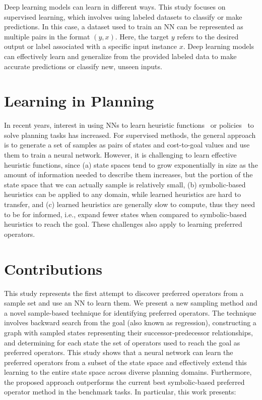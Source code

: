 \documentclass[ppgc,diss,english]{iiufrgs}
\begin{document}
Deep learning models can learn in different ways. This study focuses on supervised learning, which involves using labeled datasets to classify or make predictions. In this case, a dataset used to train an NN can be represented as multiple pairs in the format $(y, x)$. Here, the target $y$ refers to the desired output or label associated with a specific input instance $x$. Deep learning models can effectively learn and generalize from the provided labeled data to make accurate predictions or classify new, unseen inputs.

\section{Learning in Planning}
\label{sec:intro-learning-planning}
In recent years, interest in using NNs to learn heuristic functions~\cite{Ferber.etal/2020a,Yu.etal/2020,Shen.etal/2020,Ferber.etal/2022,OToole/2022} or policies~\cite{Toyer.etal/2018,Toyer.etal/2020,Stahlberg.etal/2022} to solve planning tasks has increased. For supervised methods, the general approach is to generate a set of samples as pairs of states and cost-to-goal values and use them to train a neural network. However, it is challenging to learn effective heuristic functions, since (a) state spaces tend to grow exponentially in size as the amount of information needed to describe them increases, but the portion of the state space that we can actually sample is relatively small, (b) symbolic-based heuristics can be applied to any domain, while learned heuristics are hard to transfer, and (c) learned heuristics are generally slow to compute, thus they need to be for informed, i.e., expand fewer states when compared to symbolic-based heuristics to reach the goal. These challenges also apply to learning preferred operators.

\section{Contributions}
\label{sec:intro-contributions}
This study represents the first attempt to discover preferred operators from a sample set and use an NN to learn them. We present a new sampling method and a novel sample-based technique for identifying preferred operators. The technique involves backward search from the goal (also known as regression), constructing a graph with sampled states representing their successor-predecessor relationships, and determining for each state the set of operators used to reach the goal as preferred operators. This study shows that a neural network can learn the preferred operators from a subset of the state space and effectively extend this learning to the entire state space across diverse planning domains. Furthermore, the proposed approach outperforms the current best symbolic-based preferred operator method in the benchmark tasks. In particular, this work presents:
\end{document}
